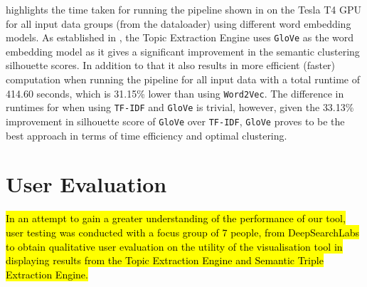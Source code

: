 \vspace{-3ex}
 highlights the time taken for running the pipeline shown in  on the Tesla T4 GPU for all input data groups (from the dataloader) using different word embedding models.
As established in , the Topic Extraction Engine uses \texttt{GloVe} as the word embedding model as it gives a significant improvement in the semantic clustering silhouette scores. In addition to that it also results in more efficient (faster) computation when running the pipeline for all input data with a total runtime of 414.60 seconds, which is 31.15\% lower than using \texttt{Word2Vec}. The difference in runtimes for when using \texttt{TF-IDF} and \texttt{GloVe} is trivial, however, given the 33.13\% improvement in silhouette score of \texttt{GloVe} over \texttt{TF-IDF}, \texttt{GloVe} proves to be the best approach in terms of time efficiency and optimal clustering. 

\section{User Evaluation} \label{s:user_eval}
\hl{In an attempt to gain a greater understanding of the performance of our tool, user testing was conducted with a focus group of 7 people, from DeepSearchLabs to obtain qualitative user evaluation on the utility of the visualisation tool in displaying results from the Topic Extraction Engine and Semantic Triple Extraction Engine.}





